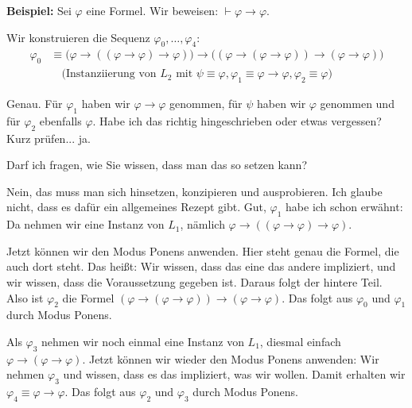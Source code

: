 \begin{math-stroke}
\textbf{Beispiel:} Sei $\varphi$ eine Formel. Wir beweisen: $\vdash \varphi \to \varphi$.

\begin{short-proof}
Wir konstruieren die Sequenz $\varphi_0, \dots, \varphi_4$:
\begin{align*}
    \varphi_0 &\equiv \bigl(\varphi \to ((\varphi \to \varphi) \to \varphi)\bigr) \to \bigl((\varphi \to (\varphi \to \varphi)) \to (\varphi \to \varphi)\bigr) \\
    &\quad \text{(Instanziierung von } L_2 \text{ mit } \psi \equiv \varphi, \varphi_1 \equiv \varphi \to \varphi, \varphi_2 \equiv \varphi\text{)}
\end{align*}
\end{short-proof}
\end{math-stroke}

\begin{spoken-clean}[00:34:50 - 00:36:57]
Genau. Für $\varphi_1$ haben wir $\varphi \to \varphi$ genommen, für $\psi$ haben wir $\varphi$ genommen und für $\varphi_2$ ebenfalls $\varphi$. Habe ich das richtig hingeschrieben oder etwas vergessen? Kurz prüfen... ja. 
\end{spoken-clean}

\begin{student-interaction}
Darf ich fragen, wie Sie wissen, dass man das so setzen kann?
\end{student-interaction}

\begin{spoken-clean}[00:36:57 - 00:38:57]
Nein, das muss man sich hinsetzen, konzipieren und ausprobieren. Ich glaube nicht, dass es dafür ein allgemeines Rezept gibt. Gut, $\varphi_1$ habe ich schon erwähnt: Da nehmen wir eine Instanz von $L_1$, nämlich $\varphi \to ((\varphi \to \varphi) \to \varphi)$.

Jetzt können wir den Modus Ponens anwenden. Hier steht genau die Formel, die auch dort steht. Das heißt: Wir wissen, dass das eine das andere impliziert, und wir wissen, dass die Voraussetzung gegeben ist. Daraus folgt der hintere Teil. Also ist $\varphi_2$ die Formel $(\varphi \to (\varphi \to \varphi)) \to (\varphi \to \varphi)$. Das folgt aus $\varphi_0$ und $\varphi_1$ durch Modus Ponens.

Als $\varphi_3$ nehmen wir noch einmal eine Instanz von $L_1$, diesmal einfach $\varphi \to (\varphi \to \varphi)$. Jetzt können wir wieder den Modus Ponens anwenden: Wir nehmen $\varphi_3$ und wissen, dass es das impliziert, was wir wollen. Damit erhalten wir $\varphi_4 \equiv \varphi \to \varphi$. Das folgt aus $\varphi_2$ und $\varphi_3$ durch Modus Ponens.
\end{spoken-clean}


